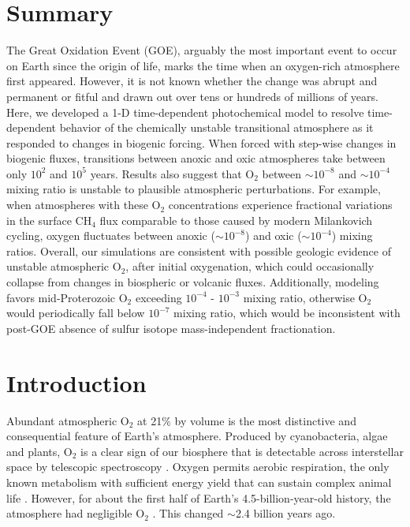 
\section*{\centering Summary}

The Great Oxidation Event (GOE), arguably the most important event to occur on Earth since the origin of life, marks the time when an oxygen-rich atmosphere first appeared. However, it is not known whether the change was abrupt and permanent or fitful and drawn out over tens or hundreds of millions of years. Here, we developed a 1-D time-dependent photochemical model to resolve time-dependent behavior of the chemically unstable transitional atmosphere as it responded to changes in biogenic forcing. When forced with step-wise changes in biogenic fluxes, transitions between anoxic and oxic atmospheres take between only $10^2$ and $10^5$ years. Results also suggest that O$_2$ between $\sim10^{-8}$ and $\sim10^{-4}$ mixing ratio is unstable to plausible atmospheric perturbations. For example, when atmospheres with these O$_2$ concentrations experience fractional variations in the surface CH$_4$ flux comparable to those caused by modern Milankovich cycling, oxygen fluctuates between anoxic ($\sim10^{-8}$) and oxic ($\sim10^{-4}$) mixing ratios. Overall, our simulations are consistent with possible geologic evidence of unstable atmospheric O$_2$, after initial oxygenation, which could occasionally collapse from changes in biospheric or volcanic fluxes. Additionally, modeling favors mid-Proterozoic O$_2$ exceeding $10^{-4}$ - $10^{-3}$ mixing ratio, otherwise O$_2$ would periodically fall below $10^{-7}$ mixing ratio, which would be inconsistent with post-GOE absence of sulfur isotope mass-independent fractionation.

\section{Introduction}

Abundant atmospheric O$_2$ at 21\% by volume is the most distinctive and consequential feature of Earth's atmosphere. Produced by cyanobacteria, algae and plants, O$_2$ is a clear sign of our biosphere that is detectable across interstellar space by telescopic spectroscopy \cite{Meadows_2018}. Oxygen permits aerobic respiration, the only known metabolism  with sufficient energy yield that can sustain complex animal life \cite{Catling_2005}. However, for about the first half of Earth's 4.5-billion-year-old history, the atmosphere had negligible O$_2$ \citep[e.g.][]{Catling_2020}. This changed $\sim$2.4 billion years ago.

